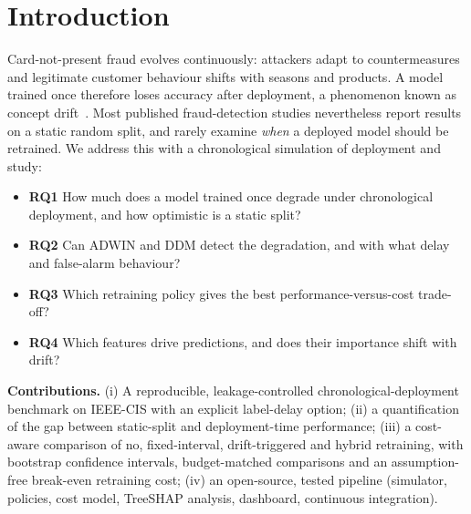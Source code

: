 \documentclass[conference]{IEEEtran}
\begin{document}
\section{Introduction}
Card-not-present fraud evolves continuously: attackers adapt to countermeasures and legitimate customer behaviour shifts with seasons
and products. A model trained once therefore loses accuracy after deployment, a phenomenon known as concept
drift~\cite{gama2014survey}. Most published fraud-detection studies nevertheless report results on a static random split, and rarely
examine \emph{when} a deployed model should be retrained. We address this with a chronological simulation of deployment and study:
\begin{itemize}
\item \textbf{RQ1} How much does a model trained once degrade under chronological deployment, and how optimistic is a static split?
\item \textbf{RQ2} Can ADWIN and DDM detect the degradation, and with what delay and false-alarm behaviour?
\item \textbf{RQ3} Which retraining policy gives the best performance-versus-cost trade-off?
\item \textbf{RQ4} Which features drive predictions, and does their importance shift with drift?
\end{itemize}
\textbf{Contributions.} (i) A reproducible, leakage-controlled chronological-deployment benchmark on IEEE-CIS with an explicit label-delay option;
(ii) a quantification of the gap between static-split and deployment-time performance; (iii) a cost-aware comparison of
no, fixed-interval, drift-triggered and hybrid retraining, with bootstrap confidence intervals, budget-matched comparisons and an assumption-free break-even
retraining cost; (iv) an open-source, tested pipeline (simulator, policies, cost model, TreeSHAP analysis, dashboard, continuous integration).
\end{document}
